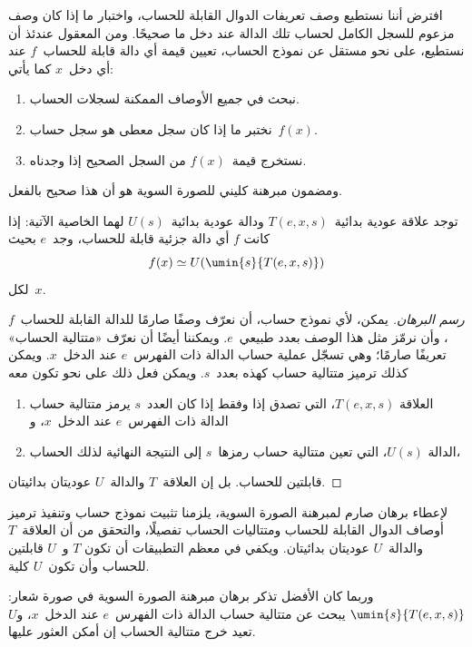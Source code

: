 \documentclass[../../../include/open-logic-section]{subfiles}
\begin{document}

افترض أننا نستطيع وصف تعريفات الدوال القابلة للحساب، واختبار ما إذا
كان وصف مزعوم للسجل الكامل لحساب تلك الدالة عند دخل ما صحيحًا. ومن
المعقول عندئذ أن نستطيع، على نحو مستقل عن نموذج الحساب، تعيين قيمة أي
دالة قابلة للحساب~$f$ عند أي دخل~$x$ كما يأتي:
\begin{enumerate}
  \item نبحث في جميع الأوصاف الممكنة لسجلات الحساب.
  \item نختبر ما إذا كان سجل معطى هو سجل حساب~$f(x)$.
  \item نستخرج قيمة~$f(x)$ من السجل الصحيح إذا وجدناه.
\end{enumerate}
ومضمون مبرهنة كليني للصورة السوية هو أن هذا صحيح بالفعل.

\begin{thm}
توجد علاقة عودية بدائية~$T(e,x,s)$ ودالة عودية بدائية~$U(s)$ لهما
الخاصية الآتية: إذا كانت $f$ أي دالة جزئية قابلة للحساب، وجد~$e$ بحيث
\[
f(x) \simeq U(\umin{s}{T(e, x, s)})
\]
لكل~$x$.
\end{thm}

\begin{proof}[رسم البرهان]
يمكن، لأي نموذج حساب، أن نعرّف وصفًا صارمًا للدالة القابلة
للحساب~$f$، وأن نرمّز مثل هذا الوصف بعدد طبيعي~$e$. ويمكننا أيضًا أن نعرّف
«متتالية الحساب» تعريفًا صارمًا؛ وهي تسجّل عملية حساب الدالة ذات
الفهرس~$e$ عند الدخل~$x$. ويمكن كذلك ترميز متتالية حساب كهذه بعدد~$s$.
ويمكن فعل ذلك على نحو تكون معه
\begin{enumerate}
  \item العلاقة $T(e,x,s)$، التي تصدق إذا وفقط إذا كان العدد~$s$
  يرمز متتالية حساب الدالة ذات الفهرس~$e$ عند الدخل~$x$، و
  \item الدالة $U(s)$، التي تعين متتالية حساب رمزها~$s$ إلى النتيجة
  النهائية لذلك الحساب،
\end{enumerate}
قابلتين للحساب. بل إن العلاقة~$T$ والدالة~$U$ عوديتان بدائيتان.
\end{proof}

\begin{explain}
لإعطاء برهان صارم لمبرهنة الصورة السوية، يلزمنا تثبيت نموذج حساب وتنفيذ
ترميز أوصاف الدوال القابلة للحساب ومتتاليات الحساب تفصيلًا، والتحقق من
أن العلاقة~$T$ والدالة~$U$ عوديتان بدائيتان. ويكفي في معظم التطبيقات
أن تكون $T$ و~$U$ قابلتين للحساب وأن تكون~$U$ كلية.

وربما كان الأفضل تذكر برهان مبرهنة الصورة السوية في صورة شعار:
$\umin{s}{T(e,x,s)}$ يبحث عن متتالية حساب الدالة ذات الفهرس~$e$ عند
الدخل~$x$، و$U$ تعيد خرج متتالية الحساب إن أمكن العثور عليها.
\end{explain}
\end{document}
